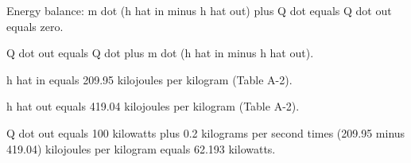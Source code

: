 Energy balance: m dot (h hat in minus h hat out) plus Q dot equals Q dot out equals zero.

Q dot out equals Q dot plus m dot (h hat in minus h hat out).

h hat in equals 209.95 kilojoules per kilogram (Table A-2).

h hat out equals 419.04 kilojoules per kilogram (Table A-2).

Q dot out equals 100 kilowatts plus 0.2 kilograms per second times (209.95 minus 419.04) kilojoules per kilogram equals 62.193 kilowatts.